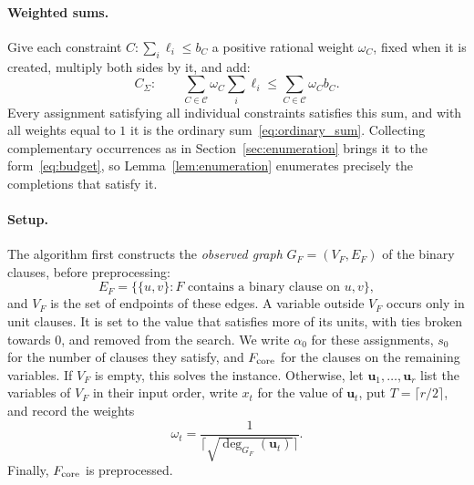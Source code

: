 \documentclass[11pt,a4paper]{article}
\theoremstyle{definition}
\theoremstyle{remark}
\begin{document}
\paragraph{Weighted sums.}
Give each constraint
$C:\sum_i\ell_i\le b_C$ a positive rational weight $\omega_C$, fixed when
it is created, multiply both sides by it, and add:
\begin{equation}
 C_\Sigma:\qquad
 \sum_{C\in\mathcal C}\omega_C\sum_i\ell_i
 \le \sum_{C\in\mathcal C}\omega_C b_C .
\label{eq:weighted}
\end{equation}
Every assignment satisfying all individual constraints satisfies this sum,
and with all weights equal to $1$ it is the ordinary
sum~\eqref{eq:ordinary_sum}. Collecting complementary occurrences as in
Section~\ref{sec:enumeration} brings it to the form~\eqref{eq:budget}, so
Lemma~\ref{lem:enumeration} enumerates precisely the completions that
satisfy it.

\paragraph{Setup.}
The algorithm first constructs the \emph{observed graph} $G_F=(V_F,E_F)$ of
the binary clauses, before preprocessing:
\begin{equation}
 E_F=\bigl\{\{u,v\}:F\text{ contains a binary clause on }u,v\bigr\},
\label{eq:observed_support}
\end{equation}
and $V_F$ is the set of endpoints of these edges. A
variable outside $V_F$ occurs only in unit clauses. It is set to the value
that satisfies more of its units, with ties broken towards $0$, and removed
from the search. We write $\alpha_0$ for these assignments, $s_0$ for the
number of clauses they satisfy, and $F_{\rm core}$ for the clauses on the
remaining variables. If $V_F$ is empty, this solves the instance. Otherwise,
let $\mathbf u_1,\ldots,\mathbf u_r$ list the variables of $V_F$ in their
input order, write $x_t$ for the value of $\mathbf u_t$, put
$T=\lceil r/2\rceil$, and record the weights
\begin{equation}
 \omega_t=\frac{1}{\lceil\sqrt{\deg_{G_F}(\mathbf u_t)}\rceil}.
 \label{eq:random_weights}
\end{equation}
Finally, $F_{\rm core}$ is preprocessed.
\end{document}

